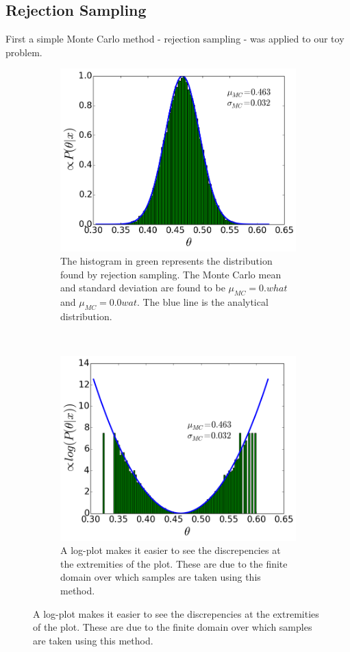 \documentclass[a4paper,11pt,twoside]{article}
\begin{document}
\subsection{Rejection Sampling} 
First a simple Monte Carlo method - rejection sampling - was applied to our toy
problem.
\begin{figure}[ht]
	\centering
	\begin{subfigure}[t]{0.4\textwidth}
		\centering
		\includegraphics[width=\textwidth]{rejection.png}
		\caption{The histogram in green represents the distribution
			found by rejection sampling. The Monte Carlo mean and standard
			deviation are found to be $\mu_{MC} = 0.what$ and $\mu_{MC} = 0.0wat$.
			The blue line is the analytical distribution.}
		\label{fig:rejection}
	\end{subfigure}
	~
	\begin{subfigure}[t]{0.4\textwidth}
		\centering
		\includegraphics[width=\textwidth]{rejlog.png}
		\caption{A log-plot makes it easier to see the discrepencies at
			the extremities of the plot. These are due to the finite
		domain over which samples are taken using this method.}
		\label{fig:rejlog}
	\end{subfigure}
\end{figure}
\end{document}
